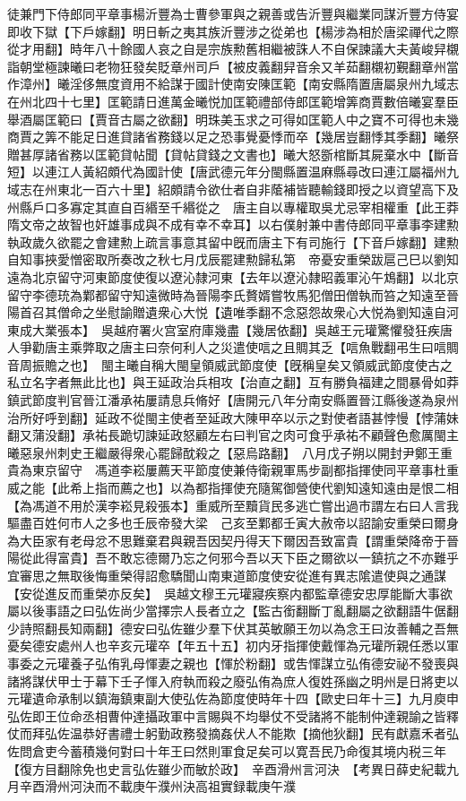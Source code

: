 徒兼門下侍郎同平章事楊沂豐為士曹參軍與之親善或告沂豐與繼業同謀沂豐方侍宴即收下獄【下戶嫁翻】明日斬之夷其族沂豐涉之從弟也【楊涉為相於唐梁禪代之際從才用翻】時年八十餘國人哀之自是宗族勲舊相繼被誅人不自保諫議大夫黃峻舁櫬詣朝堂極諫曦曰老物狂發矣貶章州司戶【被皮義翻舁音余又羊茹翻櫬初覲翻章州當作漳州】曦淫侈無度資用不給謀于國計使南安陳匡範【南安縣隋置唐屬泉州九域志在州北四十七里】匡範請日進萬金曦悦加匡範禮部侍郎匡範增筭商賈數倍曦宴羣臣舉酒屬匡範曰【賈音古屬之欲翻】明珠美玉求之可得如匡範人中之寶不可得也未幾商賈之筭不能足日進貸諸省務錢以足之恐事覺憂悸而卒【幾居豈翻悸其季翻】曦祭贈甚厚諸省務以匡範貸帖聞【貸帖貸錢之文書也】曦大怒斵棺斷其屍棄水中【斷音短】以連江人黃紹頗代為國計使【唐武德元年分閩縣置温麻縣尋改曰連江屬福州九域志在州東北一百六十里】紹頗請令欲仕者自非䕃補皆聽輸錢即授之以資望高下及州縣戶口多寡定其直自百緡至千緡從之　唐主自以專權取吳尤忌宰相權重【此王莽隋文帝之故智也奸雄事成與不成有幸不幸耳】以右僕射兼中書侍郎同平章事李建勲執政歲久欲罷之會建勲上疏言事意其留中旣而唐主下有司施行【下音戶嫁翻】建勲自知事挾愛憎密取所奏改之秋七月戊辰罷建勲歸私第　帝憂安重榮跋扈己巳以劉知遠為北京留守河東節度使復以遼沁隸河東【去年以遼沁隸昭義軍沁午鴆翻】以北京留守李德珫為鄴都留守知遠微時為晉陽李氏贅婿嘗牧馬犯僧田僧執而笞之知遠至晉陽首召其僧命之坐慰諭贈遺衆心大悦【遺唯季翻不念惡怨故衆心大悦為劉知遠自河東成大業張本】　吳越府署火宫室府庫幾盡【幾居依翻】吳越王元瓘驚懼發狂疾唐人爭勸唐主乘弊取之唐主曰奈何利人之災遣使唁之且賙其乏【唁魚戰翻弔生曰唁賙音周振贍之也】　閩主曦自稱大閩皇領威武節度使【旣稱皇矣又領威武節度使古之私立名字者無此比也】與王延政治兵相攻【治直之翻】互有勝負福建之間暴骨如莽鎮武節度判官晉江潘承祐屢請息兵脩好【唐開元八年分南安縣置晉江縣後遂為泉州治所好呼到翻】延政不從閩主使者至延政大陳甲卒以示之對使者語甚悖慢【悖蒲妹翻又蒲没翻】承祐長跪切諫延政怒顧左右曰判官之肉可食乎承祐不顧聲色愈厲閩主曦惡泉州刺史王繼嚴得衆心罷歸酖殺之【惡烏路翻】　八月戊子朔以開封尹鄭王重貴為東京留守　馮道李崧屢薦天平節度使兼侍衛親軍馬步副都指揮使同平章事杜重威之能【此希上指而薦之也】以為都指揮使充隨駕御營使代劉知遠知遠由是恨二相【為馮道不用於漢李崧見殺張本】重威所至黷貨民多逃亡嘗出過市謂左右曰人言我驅盡百姓何市人之多也壬辰帝發大梁　己亥至鄴都壬寅大赦帝以詔諭安重榮曰爾身為大臣家有老母忿不思難棄君與親吾因契丹得天下爾因吾致富貴【謂重榮降帝于晉陽從此得富貴】吾不敢忘德爾乃忘之何邪今吾以天下臣之爾欲以一鎮抗之不亦難乎宜審思之無取後悔重榮得詔愈驕聞山南東道節度使安從進有異志隂遣使與之通謀【安從進反而重榮亦反矣】　吳越文穆王元瓘寢疾察内都監章德安忠厚能斷大事欲屬以後事語之曰弘佐尚少當擇宗人長者立之【監古銜翻斷丁亂翻屬之欲翻語牛倨翻少詩照翻長知兩翻】德安曰弘佐雖少羣下伏其英敏願王勿以為念王曰汝善輔之吾無憂矣德安處州人也辛亥元瓘卒【年五十五】初内牙指揮使戴惲為元瓘所親任悉以軍事委之元瓘養子弘侑乳母惲妻之親也【惲於粉翻】或吿惲謀立弘侑德安祕不發喪與諸將謀伏甲士于幕下壬子惲入府執而殺之廢弘侑為庶人復姓孫幽之明州是日將吏以元瓘遺命承制以鎮海鎮東副大使弘佐為節度使時年十四【歐史曰年十三】九月庾申弘佐即王位命丞相曹仲達攝政軍中言賜與不均舉仗不受諸將不能制仲達親諭之皆釋仗而拜弘佐温恭好書禮士躬勤政務發摘姦伏人不能欺【摘他狄翻】民有獻嘉禾者弘佐問倉吏今蓄積幾何對曰十年王曰然則軍食足矣可以寛吾民乃命復其境内税三年【復方目翻除免也史言弘佐雖少而敏於政】　辛酉滑州言河決　【考異日薛史紀載九月辛酉滑州河決而不載庚午濮州決高祖實録載庚午濮
